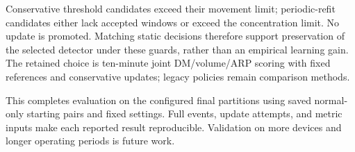 Conservative threshold candidates exceed their movement limit; periodic-refit
candidates either lack accepted windows or exceed the concentration limit.
No update is promoted. Matching static decisions therefore support preservation
of the selected detector under these guards, rather than an empirical learning
gain. The retained choice is ten-minute joint DM/volume/ARP scoring with fixed
references and conservative updates; legacy policies remain comparison methods.

This completes evaluation on the configured final partitions using saved
normal-only starting pairs and fixed settings. Full events, update attempts,
and metric inputs make each reported result reproducible. Validation on more
devices and longer operating periods is future work.
